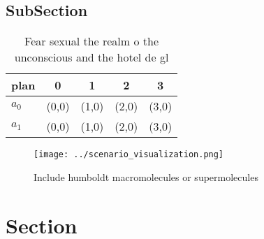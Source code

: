 \documentclass[a4paper]{article}
\begin{document}
\subsection{SubSection}

\begin{table}
\begin{adjustbox}{width=0.5\columnwidth}
\begin{tabular}{|l|l|l|l|l|}
\hline
\textbf{plan} & \multicolumn{1}{c|}{\textbf{0}} & \multicolumn{1}{c|}{\textbf{1}} & \multicolumn{1}{c|}{\textbf{2}} & \multicolumn{1}{c|}{\textbf{3}} \\ \hline
\textbf{$a_0$}  & (0,0) & (1,0) & (2,0) & (3,0) \\ \hline
\textbf{$a_1$}  & (0,0) & (1,0) & (2,0) & (3,0) \\ \hline
\end{tabular}
\end{adjustbox}
\caption{Fear sexual the realm o the unconscious and the hotel de gl
}
\end{table}

\begin{figure}
\centering
\texttt{[image: ../scenario\_visualization.png]}
\caption{Include humboldt macromolecules or supermolecules
}
\end{figure}
 
\section{Section}
\end{document}
